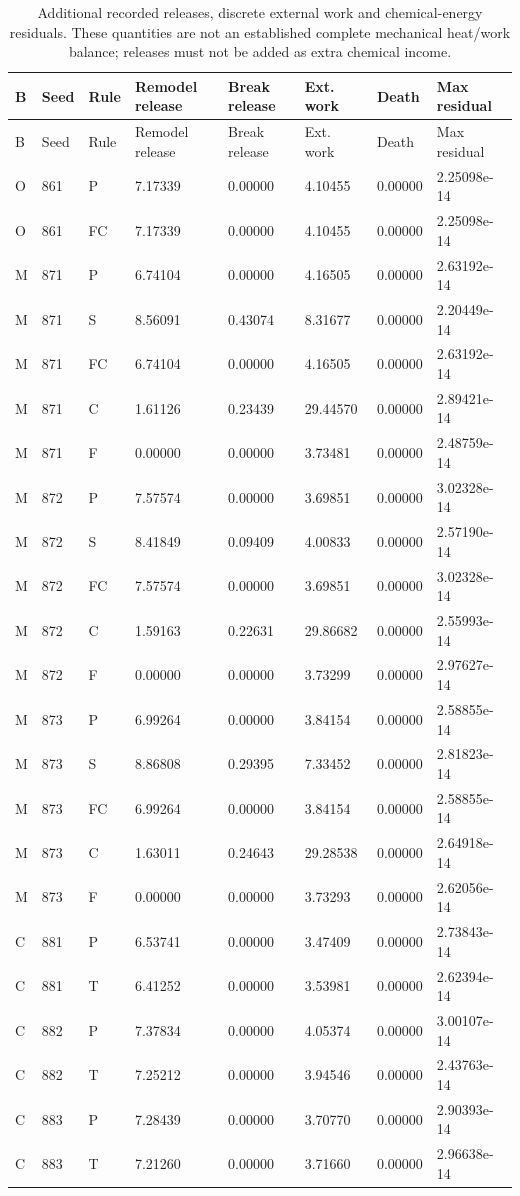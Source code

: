 \begin{longtable}{llllllll}
\caption{Additional recorded releases, discrete external work and chemical-energy residuals. These quantities are not an established complete mechanical heat/work balance; releases must not be added as extra chemical income.}\label{tab:contact-ledger-extra}\\
\toprule
B & Seed & Rule & Remodel release & Break release & Ext. work & Death & Max residual\\
\midrule\endfirsthead
\toprule
B & Seed & Rule & Remodel release & Break release & Ext. work & Death & Max residual\\
\midrule\endhead
O & 861 & P & 7.17339 & 0.00000 & 4.10455 & 0.00000 & 2.25098e-14\\
O & 861 & FC & 7.17339 & 0.00000 & 4.10455 & 0.00000 & 2.25098e-14\\
M & 871 & P & 6.74104 & 0.00000 & 4.16505 & 0.00000 & 2.63192e-14\\
M & 871 & S & 8.56091 & 0.43074 & 8.31677 & 0.00000 & 2.20449e-14\\
M & 871 & FC & 6.74104 & 0.00000 & 4.16505 & 0.00000 & 2.63192e-14\\
M & 871 & C & 1.61126 & 0.23439 & 29.44570 & 0.00000 & 2.89421e-14\\
M & 871 & F & 0.00000 & 0.00000 & 3.73481 & 0.00000 & 2.48759e-14\\
M & 872 & P & 7.57574 & 0.00000 & 3.69851 & 0.00000 & 3.02328e-14\\
M & 872 & S & 8.41849 & 0.09409 & 4.00833 & 0.00000 & 2.57190e-14\\
M & 872 & FC & 7.57574 & 0.00000 & 3.69851 & 0.00000 & 3.02328e-14\\
M & 872 & C & 1.59163 & 0.22631 & 29.86682 & 0.00000 & 2.55993e-14\\
M & 872 & F & 0.00000 & 0.00000 & 3.73299 & 0.00000 & 2.97627e-14\\
M & 873 & P & 6.99264 & 0.00000 & 3.84154 & 0.00000 & 2.58855e-14\\
M & 873 & S & 8.86808 & 0.29395 & 7.33452 & 0.00000 & 2.81823e-14\\
M & 873 & FC & 6.99264 & 0.00000 & 3.84154 & 0.00000 & 2.58855e-14\\
M & 873 & C & 1.63011 & 0.24643 & 29.28538 & 0.00000 & 2.64918e-14\\
M & 873 & F & 0.00000 & 0.00000 & 3.73293 & 0.00000 & 2.62056e-14\\
C & 881 & P & 6.53741 & 0.00000 & 3.47409 & 0.00000 & 2.73843e-14\\
C & 881 & T & 6.41252 & 0.00000 & 3.53981 & 0.00000 & 2.62394e-14\\
C & 882 & P & 7.37834 & 0.00000 & 4.05374 & 0.00000 & 3.00107e-14\\
C & 882 & T & 7.25212 & 0.00000 & 3.94546 & 0.00000 & 2.43763e-14\\
C & 883 & P & 7.28439 & 0.00000 & 3.70770 & 0.00000 & 2.90393e-14\\
C & 883 & T & 7.21260 & 0.00000 & 3.71660 & 0.00000 & 2.96638e-14\\
\bottomrule
\end{longtable}
